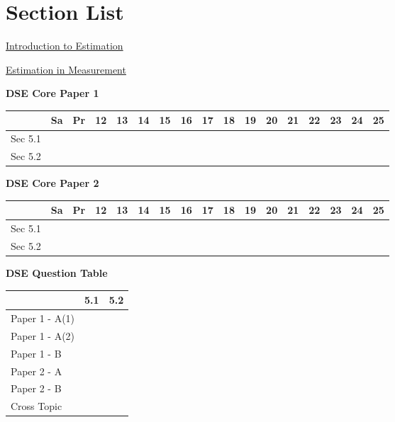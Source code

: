 \documentclass[12pt, a4paper]{article}
\begin{document}
\section*{Section List}
\begin{enumx}[label=Sec 5.\arabic*\ ]
\item \hyperref[section:1-5-1]{Introduction to Estimation}
\item \hyperref[section:1-5-2]{Estimation in Measurement}
\end{enumx}
\begin{absolutelynopagebreak}
\begin{center}
\textbf{DSE Core Paper 1}
\end{center}
\begin{center}
\begin{tabular}{|l|c|c|c|c|c|c|c|c|c|c|c|c|c|c|c|c|}
\hline
        & Sa & Pr & 12 & 13 & 14 & 15 & 16 & 17 & 18 & 19 & 20 & 21 & 22 & 23 & 24 & 25 \\\hline\hline
Sec 5.1 &  &  &  &  &  &  &  &  &  &  &  &  &  &  &  &  \\\hline
Sec 5.2 &  &  &  &  &  &  &  &  &  &  &  &  &  &  &  &  \\\hline
\end{tabular}
\end{center}
\end{absolutelynopagebreak}
\begin{absolutelynopagebreak}
\begin{center}
\textbf{DSE Core Paper 2}
\end{center}
\begin{center}
\begin{tabular}{|l|c|c|c|c|c|c|c|c|c|c|c|c|c|c|c|c|}
\hline
        & Sa & Pr & 12 & 13 & 14 & 15 & 16 & 17 & 18 & 19 & 20 & 21 & 22 & 23 & 24 & 25 \\\hline\hline
Sec 5.1 &  &  &  &  &  &  &  &  &  &  &  &  &  &  &  &  \\\hline
Sec 5.2 &  &  &  &  &  &  &  &  &  &  &  &  &  &  &  &  \\\hline
\end{tabular}
\end{center}
\end{absolutelynopagebreak}
\begin{absolutelynopagebreak}
\begin{center}
\textbf{DSE Question Table}
\end{center}
\begin{center}
\begin{tabular}{|l|c|c|}
\hline
        & 5.1 & 5.2 \\\hline
\hline
Paper 1 - A(1)&  &  \\
\hline
Paper 1 - A(2)&  &  \\
\hline
Paper 1 - B&  &  \\
\hline
\hline
Paper 2 - A&  &  \\
\hline
Paper 2 - B&  &  \\
\hline
\hline
Cross Topic&  &  \\
\hline
\end{tabular}
\end{center}
\end{absolutelynopagebreak}
\end{document}
